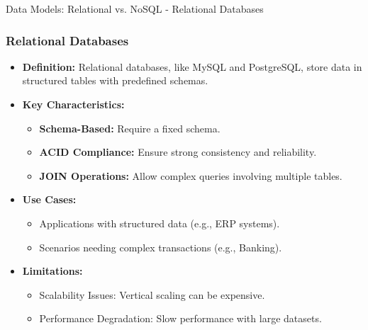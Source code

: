 \documentclass[aspectratio=169]{beamer}
\begin{document}
\begin{frame}[fragile]{Data Models: Relational vs. NoSQL - Relational Databases}
    \frametitle{Relational Databases}
    \begin{itemize}
        \item \textbf{Definition:} Relational databases, like MySQL and PostgreSQL, store data in structured tables with predefined schemas.
        \item \textbf{Key Characteristics:}
            \begin{itemize}
                \item \textbf{Schema-Based:} Require a fixed schema.
                \item \textbf{ACID Compliance:} Ensure strong consistency and reliability.
                \item \textbf{JOIN Operations:} Allow complex queries involving multiple tables.
            \end{itemize}
        \item \textbf{Use Cases:}
            \begin{itemize}
                \item Applications with structured data (e.g., ERP systems).
                \item Scenarios needing complex transactions (e.g., Banking).
            \end{itemize}
        \item \textbf{Limitations:}
            \begin{itemize}
                \item Scalability Issues: Vertical scaling can be expensive.
                \item Performance Degradation: Slow performance with large datasets.
            \end{itemize}
    \end{itemize}
\end{frame}
\end{document}
